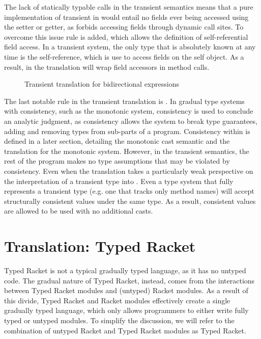 \documentclass[a4paper,USenglish]{tex/lipics-v2016}
\begin{document}
The lack of statically typable calls in the transient semantics means that a
pure implementation of transient in  \kafka would entail no fields ever being
accessed using the setter or getter, as \kafka forbids accessing fields through
dynamic call sites. To overcome this issue rule  is added, which
allows the definition of self-referential field access. In a transient  system,
the only type that is absolutely known at any time is the self-reference, which
is use to access fields on the  self object. As a result, in \kafka the
translation will wrap field accessors in method calls.

\begin{figure}
\begin{mathpar}

\end{mathpar}
\caption{Transient translation for bidirectional expressions}
\label{fig:tratrans_exp2}
\end{figure}

The last notable rule in the transient translation is . In gradual type systems with consistency, such as the monotonic system, 
consistency is used to conclude an analytic judgment, as consistency allows the system to break type guarantees, adding and removing types from sub-parts of a program.
Consistency within \kafka is defined in a later section, detailing the monotonic cast semantic and the translation for the monotonic system.   
However, in the transient semantics, the rest of the program makes no type assumptions that may be violated by consistency. Even when the 
translation takes a particularly weak perspective on the interpretation of a transient type into \kafka. Even a type system that
fully represents a transient type (e.g. one that tracks only method names) will accept structurally consistent values under the 
same type. As a result, consistent values are allowed to be used with no additional casts.

\section{Translation: Typed Racket}


Typed Racket is not a typical gradually typed language, as it has no untyped
code. The gradual nature of Typed Racket, instead, comes from the interactions
between Typed Racket modules and  (untyped) Racket modules. As a result of this
divide, Typed Racket and Racket modules effectively create a single gradually
typed language, which only allows programmers to either write fully typed or
untyped modules. To simplify the discussion, we will refer to the combination of
untyped Racket and Typed Racket modules as Typed Racket.
\end{document}
